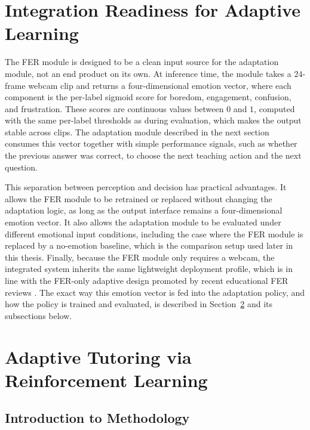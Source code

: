 \section{Integration Readiness for Adaptive Learning}\label{sec:method_integration}

The FER module is designed to be a clean input source for the adaptation module, not an end product on its own. At inference time, the module takes a $24$-frame webcam clip and returns a four-dimensional emotion vector, where each component is the per-label sigmoid score for boredom, engagement, confusion, and frustration. These scores are continuous values between $0$ and $1$, computed with the same per-label thresholds as during evaluation, which makes the output stable across clips. The adaptation module described in the next section consumes this vector together with simple performance signals, such as whether the previous answer was correct, to choose the next teaching action and the next question.

This separation between perception and decision has practical advantages. It allows the FER module to be retrained or replaced without changing the adaptation logic, as long as the output interface remains a four-dimensional emotion vector. It also allows the adaptation module to be evaluated under different emotional input conditions, including the case where the FER module is replaced by a no-emotion baseline, which is the comparison setup used later in this thesis. Finally, because the FER module only requires a webcam, the integrated system inherits the same lightweight deployment profile, which is in line with the FER-only adaptive design promoted by recent educational FER reviews \cite{lek_academic_2023,florestiyanto_emotion_2024,vistorte_integrating_2024}. The exact way this emotion vector is fed into the adaptation policy, and how the policy is trained and evaluated, is described in Section~\ref{sec:method_rl_chapter} and its subsections below.

\section{Adaptive Tutoring via Reinforcement Learning}\label{sec:method_rl_chapter}

\subsection{Introduction to Methodology}\label{sec:method_rl_intro}

